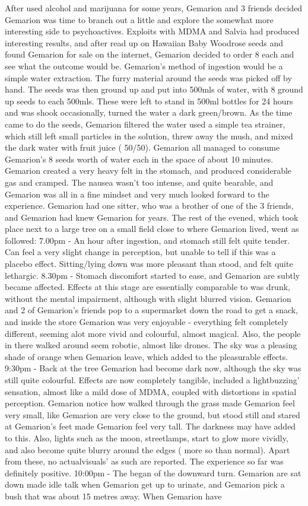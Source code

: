 \documentclass[12pt]{book}
\begin{document}
After used alcohol and marijuana for some years, Gemarion and 3 friends decided Gemarion was time to branch out a little and explore the somewhat more interesting side to psychoactives. Exploits with MDMA and Salvia had produced interesting results, and after read up on Hawaiian Baby Woodrose seeds and found Gemarion for sale on the internet, Gemarion decided to order 8 each and see what the outcome would be. Gemarion's method of ingestion would be a simple water extraction. The furry material around the seeds was picked off by hand. The seeds was then ground up and put into 500mls of water, with 8 ground up seeds to each 500mls. These were left to stand in 500ml bottles for 24 hours and was shook occasionally, turned the water a dark green/brown. As the time came to do the seeds, Gemarion filtered the water used a simple tea strainer, which still left small particles in the solution, threw away the mush, and mixed the dark water with fruit juice ( 50/50). Gemarion all managed to consume Gemarion's 8 seeds worth of water each in the space of about 10 minutes. Gemarion created a very heavy felt in the stomach, and produced considerable gas and cramped. The nausea wasn't too intense, and quite bearable, and Gemarion was all in a fine mindset and very much looked forward to the experience. Gemarion had one sitter, who was a brother of one of the 3 friends, and Gemarion had knew Gemarion for years. The rest of the evened, which took place next to a large tree on a small field close to where Gemarion lived, went as followed: 7.00pm - An hour after ingestion, and stomach still felt quite tender. Can feel a very slight change in perception, but unable to tell if this was a placebo effect. Sitting/lying down was more pleasant than stood, and felt quite lethargic. 8.30pm - Stomach discomfort started to ease, and Gemarion are subtly became affected. Effects at this stage are essentially comparable to was drunk, without the mental impairment, although with slight blurred vision. Gemarion and 2 of Gemarion's friends pop to a supermarket down the road to get a snack, and inside the store Gemarion was very enjoyable - everything felt completely different, seeming alot more vivid and colourful, almost magical. Also, the people in there walked around seem robotic, almost like drones. The sky was a pleasing shade of orange when Gemarion leave, which added to the pleasurable effects. 9:30pm - Back at the tree Gemarion had become dark now, although the sky was still quite colourful. Effects are now completely tangible, included a lightbuzzing' sensation, almost like a mild dose of MDMA, coupled with distortions in spatial perception. Gemarion notice how walked through the grass made Gemarion feel very small, like Gemarion are very close to the ground, but stood still and stared at Gemarion's feet made Gemarion feel very tall. The darkness may have added to this. Also, lights such as the moon, streetlamps, start to glow more vividly, and also become quite blurry around the edges ( more so than normal). Apart from these, no actualvisuals' as such are reported. The experience so far was definitely positive. 10:00pm - The began of the downward turn. Gemarion are sat down made idle talk when Gemarion get up to urinate, and Gemarion pick a bush that was about 15 metres away. When Gemarion have 
\end{document}
